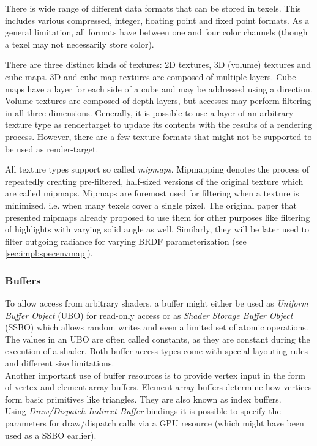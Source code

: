 \documentclass[thesis.tex]{subfiles}
\begin{document}
There is wide range of different data formats that can be stored in texels.
This includes various compressed, integer, floating point and fixed point formats.
As a general limitation, all formats have between one and four color channels (though a texel may not necessarily store color).

There are three distinct kinds of textures: 2D textures, 3D (volume) textures and cube-maps.
3D and cube-map textures are composed of multiple layers.
Cube-maps have a layer for each side of a cube and may be addressed using a direction.
Volume textures are composed of depth layers, but accesses may perform filtering in all three dimensions.
Generally, it is possible to use a layer of an arbitrary texture type as rendertarget to update its contents with the results of a rendering process.
However, there are a few texture formats that might not be supported to be used as render-target.

All texture types support so called \emph{mipmaps}.
Mipmapping denotes the process of repeatedly creating pre-filtered, half-sized versions of the original texture which are called mipmaps.
Mipmaps are foremost used for filtering when a texture is minimized, i.e. when many texels cover a single pixel.
The original paper \cite{bib:mipmap} that presented mipmaps already proposed to use them for other purposes like filtering of highlights with varying solid angle as well.
Similarly, they will be later used to filter outgoing radiance for varying BRDF parameterization (see \autoref{sec:impl:specenvmap}).

\subsubsection{Buffers}
To allow access from arbitrary shaders, a buffer might either be used as \emph{Uniform Buffer Object} (UBO) for read-only access or as \emph{Shader Storage Buffer Object} (SSBO) which allows random writes and even a limited set of atomic operations.
The values in an UBO are often called constants, as they are constant during the execution of a shader.
Both buffer access types come with special layouting rules and different size limitations.
\\
Another important use of buffer resources is to provide vertex input in the form of vertex and element array buffers.
Element array buffers determine how vertices form basic primitives like triangles. 
They are also known as index buffers.
\\
Using \emph{Draw/Dispatch Indirect Buffer} bindings it is possible to specify the parameters for draw/dispatch calls via a GPU resource (which might have been used as a SSBO earlier).
\end{document}
